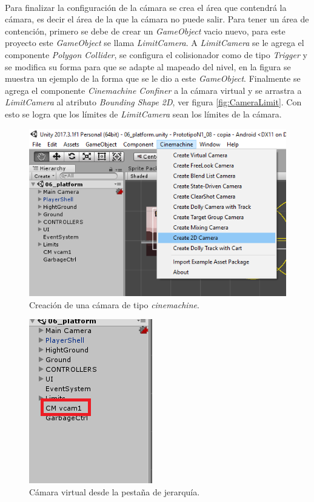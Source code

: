 \\
\par
Para finalizar la configuración de la cámara se crea el área que contendrá la cámara,
es decir el área de la que la cámara no puede salir. Para tener un área de
contención, primero se debe de crear un \textit{GameObject} vacio nuevo, para
este proyecto este \textit{GameObject} se llama \textit{LimitCamera}. A
\textit{LimitCamera} se le agrega el componente \textit{Polygon Collider}, se
configura el colisionador como de tipo \textit{Trigger} y se modifica su forma
para que se adapte al mapeado del nivel, en la figura se muestra un ejemplo de la
forma que se le dio a este \textit{GameObject}. Finalmente se agrega el componente
\textit{Cinemachine Confiner} a la cámara virtual y se arrastra a
\textit{LimitCamera} al atributo \textit{Bounding Shape 2D}, ver figura
\ref{fig:CameraLimit}. Con esto se logra que los límites de \textit{LimitCamera}
sean los límites de la cámara.

\begin{figure}[h]
        \centering
        \includegraphics[height=0.2 \textheight]{03TrabajoRealizado/imagenes/cinemachine0001.png}
        \caption{Creación de una cámara de tipo \textit{cinemachine}.}
        \label{fig:CinemachineCreate}
\end{figure}

\begin{figure}[h]
        \centering
        \includegraphics[height=0.2 \textheight]{03TrabajoRealizado/imagenes/cinemachine0002.png}
        \caption{Cámara virtual desde la pestaña de jerarquía.}
        \label{fig:VitualCamera}
\end{figure}

